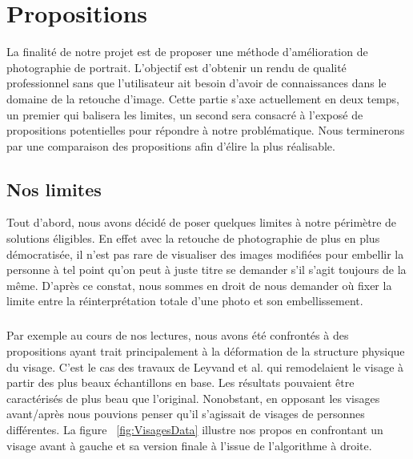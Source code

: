 \documentclass[11pt, french,screen]{report-rd-info}
\begin{document}
\chapter{Propositions}
\label{chap:Propositions}
La finalité de notre projet est de proposer une méthode d'amélioration de photographie de portrait. L’objectif est d’obtenir un rendu de qualité professionnel sans que l’utilisateur ait besoin d’avoir de connaissances dans le domaine de la retouche d’image.
Cette partie s’axe actuellement en deux temps, un premier qui balisera les limites, un second sera consacré à l’exposé de propositions potentielles pour répondre à notre problématique. Nous terminerons par une comparaison des propositions afin d’élire la plus réalisable.
\section{Nos limites}
Tout d’abord, nous avons décidé de poser quelques limites à notre périmètre de solutions éligibles. En effet avec la retouche de photographie de plus en plus démocratisée, il n’est pas rare de visualiser des images modifiées pour embellir la personne à tel point qu’on peut à juste titre se demander s’il s’agit toujours de la même. D’après ce constat, nous sommes en droit de nous demander où fixer la limite entre la réinterprétation totale d’une photo et son embellissement.
\paragraph*{}
Par exemple au cours de nos lectures, nous avons été confrontés à des propositions ayant trait principalement à la déformation de la structure physique du visage. C'est le cas des travaux de Leyvand et al. \cite{Leyvand2008} qui remodelaient le visage à partir des plus beaux échantillons en base. Les résultats pouvaient être caractérisés de plus beau que l’original. Nonobstant, en opposant les visages avant/après nous pouvions penser qu’il s'agissait de visages de personnes différentes. La figure ~\ref{fig:VisagesData} illustre nos propos en confrontant un visage avant à gauche et sa version finale à l’issue de l’algorithme à droite.
\end{document}
